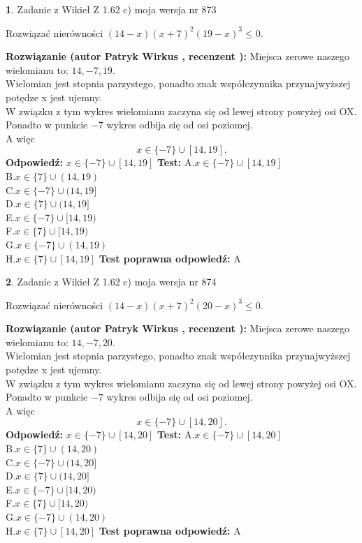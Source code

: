 \documentclass[12pt, a4paper]{article}
\theoremstyle{definition} %
\newtheorem{zad}{}
\newcommand{\zadStart}[1]{\begin{zad}#1\newline}
\newcommand{\zadStop}{\end{zad}}
\newcommand{\rozwStart}[2]{\noindent \textbf{Rozwiązanie (autor #1 , recenzent #2): }\newline}
\newcommand{\rozwStop}{\newline}
\newcommand{\odpStart}{\noindent \textbf{Odpowiedź:}\newline}
\newcommand{\odpStop}{\newline}
\newcommand{\testStart}{\noindent \textbf{Test:}\newline}
\newcommand{\testStop}{\newline}
\newcommand{\kluczStart}{\noindent \textbf{Test poprawna odpowiedź:}\newline}
\newcommand{\kluczStop}{\newline}
\begin{document}
\zadStart{Zadanie z Wikieł Z 1.62 c) moja wersja nr 873}

Rozwiązać nierówności $(14-x)(x+7)^{2}(19-x)^{3}\le0$.
\zadStop
\rozwStart{Patryk Wirkus}{}
Miejsca zerowe naszego wielomianu to: $14, -7, 19$.\\
Wielomian jest stopnia parzystego, ponadto znak współczynnika przy\linebreak najwyższej potędze x jest ujemny.\\ W związku z tym wykres wielomianu zaczyna się od lewej strony powyżej osi OX.\\
Ponadto w punkcie $-7$ wykres odbija się od osi poziomej.\\
A więc $$x \in \{-7\} \cup [14,19].$$
\rozwStop
\odpStart
$x \in \{-7\} \cup [14,19]$
\odpStop
\testStart
A.$x \in \{-7\} \cup [14,19]$\\
B.$x \in \{7\} \cup (14,19)$\\
C.$x \in \{-7\} \cup (14,19]$\\
D.$x \in \{7\} \cup (14,19]$\\
E.$x \in \{-7\} \cup [14,19)$\\
F.$x \in \{7\} \cup [14,19)$\\
G.$x \in \{-7\} \cup (14,19)$\\
H.$x \in \{7\} \cup [14,19]$
\testStop
\kluczStart
A
\kluczStop



\zadStart{Zadanie z Wikieł Z 1.62 c) moja wersja nr 874}

Rozwiązać nierówności $(14-x)(x+7)^{2}(20-x)^{3}\le0$.
\zadStop
\rozwStart{Patryk Wirkus}{}
Miejsca zerowe naszego wielomianu to: $14, -7, 20$.\\
Wielomian jest stopnia parzystego, ponadto znak współczynnika przy\linebreak najwyższej potędze x jest ujemny.\\ W związku z tym wykres wielomianu zaczyna się od lewej strony powyżej osi OX.\\
Ponadto w punkcie $-7$ wykres odbija się od osi poziomej.\\
A więc $$x \in \{-7\} \cup [14,20].$$
\rozwStop
\odpStart
$x \in \{-7\} \cup [14,20]$
\odpStop
\testStart
A.$x \in \{-7\} \cup [14,20]$\\
B.$x \in \{7\} \cup (14,20)$\\
C.$x \in \{-7\} \cup (14,20]$\\
D.$x \in \{7\} \cup (14,20]$\\
E.$x \in \{-7\} \cup [14,20)$\\
F.$x \in \{7\} \cup [14,20)$\\
G.$x \in \{-7\} \cup (14,20)$\\
H.$x \in \{7\} \cup [14,20]$
\testStop
\kluczStart
A
\kluczStop
\end{document}
